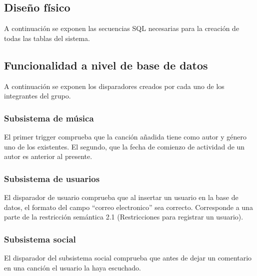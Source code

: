 \subsection{Diseño físico}

A continuación se exponen las secuencias SQL necesarias para la creación de todas las tablas del sistema.

 

\subsection{Funcionalidad a nivel de base de datos}

A continuación se exponen los disparadores creados por cada uno de los integrantes del grupo.

\subsubsection{Subsistema de música}

El primer trigger comprueba que la canción añadida tiene como autor y género uno de los existentes. El segundo, que la fecha de comienzo de actividad de un autor es anterior al presente.

 


\subsubsection{Subsistema de usuarios}

El disparador de usuario comprueba que al insertar un usuario en la base de datos, el formato del campo ``correo electronico'' sea correcto. Corresponde a una parte de la restricción semántica 2.1 (Restricciones para registrar un usuario).
 

\subsubsection{Subsistema social}
El disparador del subsistema social comprueba que antes de dejar un comentario en una canción el usuario la haya escuchado.
 
